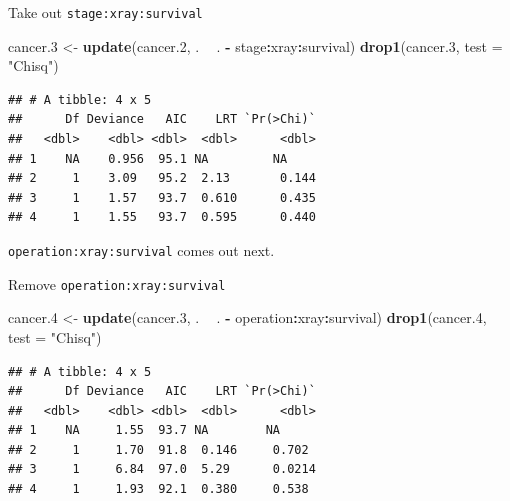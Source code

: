 \documentclass[
  ignorenonframetext,
]{beamer}
\newenvironment{Shaded}{\begin{snugshade}}{\end{snugshade}}
\newcommand{\DataTypeTok}[1]{\textcolor[rgb]{0.13,0.29,0.53}{#1}}
\newcommand{\FloatTok}[1]{\textcolor[rgb]{0.00,0.00,0.81}{#1}}
\newcommand{\KeywordTok}[1]{\textcolor[rgb]{0.13,0.29,0.53}{\textbf{#1}}}
\newcommand{\NormalTok}[1]{#1}
\newcommand{\OperatorTok}[1]{\textcolor[rgb]{0.81,0.36,0.00}{\textbf{#1}}}
\newcommand{\StringTok}[1]{\textcolor[rgb]{0.31,0.60,0.02}{#1}}
\begin{document}
\begin{frame}[fragile]{Take out \texttt{stage:xray:survival}}
\protect\hypertarget{take-out-stagexraysurvival}{}

\scriptsize

\begin{Shaded}
\begin{Highlighting}[]
\NormalTok{cancer}\FloatTok{.3}\NormalTok{ <-}\StringTok{ }\KeywordTok{update}\NormalTok{(cancer}\FloatTok{.2}\NormalTok{, . }\OperatorTok{~}\StringTok{ }\NormalTok{. }\OperatorTok{-}\StringTok{ }\NormalTok{stage}\OperatorTok{:}\NormalTok{xray}\OperatorTok{:}\NormalTok{survival)}
\KeywordTok{drop1}\NormalTok{(cancer}\FloatTok{.3}\NormalTok{, }\DataTypeTok{test =} \StringTok{"Chisq"}\NormalTok{)}
\end{Highlighting}
\end{Shaded}

\begin{verbatim}
## # A tibble: 4 x 5
##      Df Deviance   AIC    LRT `Pr(>Chi)`
##   <dbl>    <dbl> <dbl>  <dbl>      <dbl>
## 1    NA    0.956  95.1 NA         NA    
## 2     1    3.09   95.2  2.13       0.144
## 3     1    1.57   93.7  0.610      0.435
## 4     1    1.55   93.7  0.595      0.440
\end{verbatim}

\normalsize

\texttt{operation:xray:survival} comes out next.

\end{frame}

\begin{frame}[fragile]{Remove \texttt{operation:xray:survival}}
\protect\hypertarget{remove-operationxraysurvival}{}

\scriptsize

\begin{Shaded}
\begin{Highlighting}[]
\NormalTok{cancer}\FloatTok{.4}\NormalTok{ <-}\StringTok{ }\KeywordTok{update}\NormalTok{(cancer}\FloatTok{.3}\NormalTok{, . }\OperatorTok{~}\StringTok{ }\NormalTok{. }\OperatorTok{-}\StringTok{ }\NormalTok{operation}\OperatorTok{:}\NormalTok{xray}\OperatorTok{:}\NormalTok{survival)}
\KeywordTok{drop1}\NormalTok{(cancer}\FloatTok{.4}\NormalTok{, }\DataTypeTok{test =} \StringTok{"Chisq"}\NormalTok{)}
\end{Highlighting}
\end{Shaded}

\begin{verbatim}
## # A tibble: 4 x 5
##      Df Deviance   AIC    LRT `Pr(>Chi)`
##   <dbl>    <dbl> <dbl>  <dbl>      <dbl>
## 1    NA     1.55  93.7 NA        NA     
## 2     1     1.70  91.8  0.146     0.702 
## 3     1     6.84  97.0  5.29      0.0214
## 4     1     1.93  92.1  0.380     0.538
\end{verbatim}

\normalsize

\end{frame}
\end{document}
